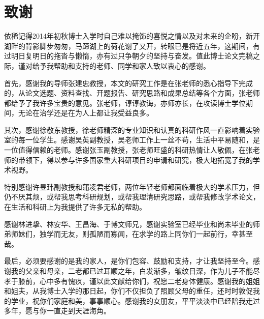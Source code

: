 
\chapter*{致谢}

{\fangsong 依稀记得2014年初秋博士入学时自己难以掩饰的喜悦之情以及对未来的企盼，新开湖畔的背影脚步匆匆，马蹄湖上的荷花谢了又开，转眼已是将近五年，这期间，有过明日复明日的拖沓与懒惰，亦有过只争朝夕的坚持与奋发。值此博士论文完稿之际，谨对给予我帮助和支持的老师、同学和家人致以衷心的感谢。}

{\fangsong 首先，感谢我的导师张建忠教授，本文的研究工作是在张老师的悉心指导下完成的，从论文选题、资料查找、开题报告、研究思路和成果总结等各个方面，张老师都给予了我许多宝贵的意见。张老师，谆谆教诲，亦师亦长，在攻读博士学位期间，无论在治学还是在为人上都让我受益良多。}

{\fangsong 其次，感谢徐敬东教授，徐老师精深的专业知识和认真的科研作风一直影响着实验室的每一位学生。感谢吴英副教授，吴老师工作上一丝不苟，生活中平易随和，是一位值得信赖的老师。感谢张玉副教授，张老师旺盛的科研热情让人敬佩，在张老师的带领下，得以参与许多国家重大科研项目的申请和研究，极大地拓宽了我的学术视野。}

{\fangsong 特别感谢许昱玮副教授和蒲凌君老师，两位年轻老师都面临着极大的学术压力，但仍不厌其烦，或帮我思考科研规划，或帮我理清研究思路，或帮我修改学术论文，在生活和科研上为我提供了许多无私的帮助。}

{\fangsong 感谢林进挚、林安华、王昌海、于博文师兄，感谢实验室已经毕业和尚未毕业的师弟师妹们，独学而无友，则孤陋而寡闻，在求学的路上同你们一起前行，幸甚至哉。}

{\fangsong 最后，必须要感谢的是我的家人，是你们包容、鼓励和支持，才让我坚持至今。感谢我的父亲和母亲，二老都已过耳顺之年，白发渐多，皱纹日深，作为儿子不能尽孝于膝前，心中多有愧疚，谨以此文献给你们，祝愿二老身体健康。感谢我的姐姐和姐夫，从我博士入学的那日起，你们不仅担负了照顾父母的重任，还时时敦促我的学业，祝你们家庭和美，事事顺心。感谢我的女朋友，平平淡淡中已经陪我走过多年，愿与你一直走到天涯海角。}
